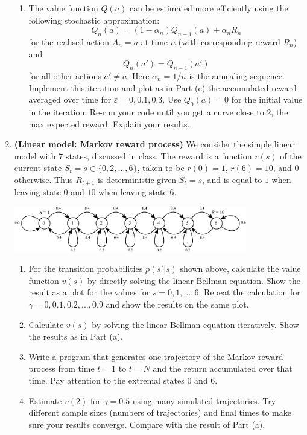 \documentclass[11pt,a4paper]{article}
\newcommand{\eps}{\varepsilon}
\newcommand{\wt}{\marginpar{[*]}}
\begin{document}
\begin{enumerate}[\bf Q1.]
\begin{enumerate}[\bf (a)]
\item The value function $Q(a)$ can be estimated more efficiently using the following stochastic approximation:
\[
Q_n (a) = (1-\alpha_n) Q_{n-1}(a) + \alpha_n R_n
\]
for the realised action $A_n=a$ at time $n$ (with corresponding reward $R_n$) and
\[
Q_n(a') = Q_{n-1}(a')
\]
for all other actions $a'\neq a$. Here $\alpha_n=1/n$ is the annealing sequence. Implement this iteration and plot as in Part (c) the accumulated reward averaged over time for $\eps=0, 0.1, 0.3$. Use $Q_0(a)=0$ for the initial value in the iteration. Re-run your code until you get a curve close to $2$, the max expected reward. Explain your results.
\end{enumerate}

\item \textbf{(Linear model: Markov reward process)} We consider the simple linear model with 7 states, discussed in class. The reward is a function $r(s)$ of the current state $S_t =s\in \{0,2,\ldots, 6\}$, taken to be $r(0)=1$, $r(6)=10$, and $0$ otherwise. Thus $R_{t+1}$ is deterministic given $S_t=s$, and is equal to $1$ when leaving state $0$ and $10$ when leaving state $6$.
\begin{center}
\includegraphics[width=0.8\textwidth]{marsroverexample1-crop.pdf}
\end{center}
\begin{enumerate}[\bf (a)]
\item For the transition probabilities $p(s'|s)$ shown above, calculate the value function $v(s)$ by directly solving the linear Bellman equation. Show the result as a plot for the values for $s=0,1,\ldots,6$. Repeat the calculation for $\gamma=0,0.1,0.2,\ldots, 0.9$ and show the results on the same plot.
\item Calculate \wt $v(s)$ by solving the linear Bellman equation iteratively. Show the results as in Part (a).
\item Write a program that generates one trajectory of the Markov reward process from time $t=1$ to $t=N$ and the return accumulated over that time. Pay attention to the extremal states $0$ and $6$. 
\item Estimate $v(2)$ for $\gamma=0.5$ using many simulated trajectories. Try different sample sizes (numbers of trajectories) and final times to make sure your results converge. Compare with the result of Part (a).
\end{enumerate}


\end{enumerate}
\end{document}
